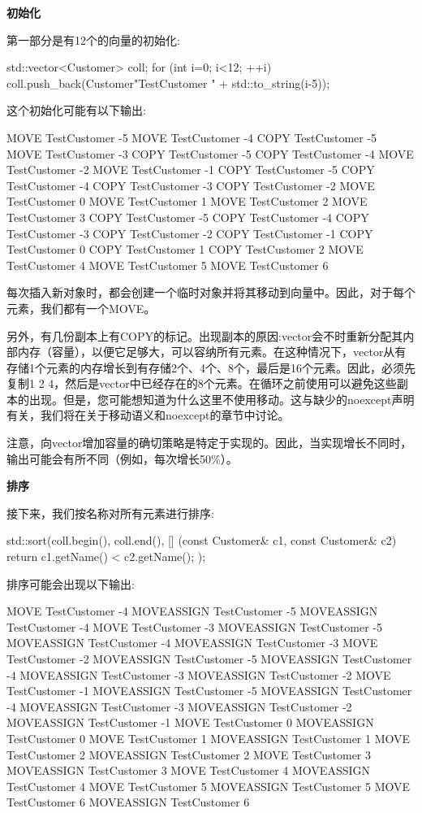 \textbf{初始化}

第一部分是有12个的向量的初始化:

\begin{cppcode}
std::vector<Customer> coll;
for (int i=0; i<12; ++i) {
	coll.push_back(Customer{"TestCustomer " + std::to_string(i-5)});
}
\end{cppcode}

这个初始化可能有以下输出:

\begin{outputcode}
MOVE TestCustomer -5
MOVE TestCustomer -4
COPY TestCustomer -5
MOVE TestCustomer -3
COPY TestCustomer -5
COPY TestCustomer -4
MOVE TestCustomer -2
MOVE TestCustomer -1
COPY TestCustomer -5
COPY TestCustomer -4
COPY TestCustomer -3
COPY TestCustomer -2
MOVE TestCustomer 0
MOVE TestCustomer 1
MOVE TestCustomer 2
MOVE TestCustomer 3
COPY TestCustomer -5
COPY TestCustomer -4
COPY TestCustomer -3
COPY TestCustomer -2
COPY TestCustomer -1
COPY TestCustomer 0
COPY TestCustomer 1
COPY TestCustomer 2
MOVE TestCustomer 4
MOVE TestCustomer 5
MOVE TestCustomer 6
\end{outputcode}

每次插入新对象时，都会创建一个临时对象并将其移动到向量中。因此，对于每个元素，我们都有一个MOVE。

另外，有几份副本上有COPY的标记。出现副本的原因:vector会不时重新分配其内部内存（容量），以便它足够大，可以容纳所有元素。在这种情况下，vector从有存储1个元素的内存增长到有存储2个、4个、8个，最后是16个元素。因此，必须先复制1 2 4，然后是vector中已经存在的8个元素。在循环之前使用可以避免这些副本的出现。但是，您可能想知道为什么这里不使用移动。这与缺少的noexcept声明有关，我们将在关于移动语义和noexcept的章节中讨论。

注意，向vector增加容量的确切策略是特定于实现的。因此，当实现增长不同时，输出可能会有所不同（例如，每次增长50\%）。

\textbf{排序}

接下来，我们按名称对所有元素进行排序:

\begin{cppcode}
std::sort(coll.begin(), coll.end(),
	[] (const Customer& c1, const Customer& c2) {
		return c1.getName() < c2.getName();
	});
\end{cppcode}

排序可能会出现以下输出:

\begin{outputcode}
MOVE TestCustomer -4
MOVEASSIGN TestCustomer -5
MOVEASSIGN TestCustomer -4
MOVE TestCustomer -3
MOVEASSIGN TestCustomer -5
MOVEASSIGN TestCustomer -4
MOVEASSIGN TestCustomer -3
MOVE TestCustomer -2
MOVEASSIGN TestCustomer -5
MOVEASSIGN TestCustomer -4
MOVEASSIGN TestCustomer -3
MOVEASSIGN TestCustomer -2
MOVE TestCustomer -1
MOVEASSIGN TestCustomer -5
MOVEASSIGN TestCustomer -4
MOVEASSIGN TestCustomer -3
MOVEASSIGN TestCustomer -2
MOVEASSIGN TestCustomer -1
MOVE TestCustomer 0
MOVEASSIGN TestCustomer 0
MOVE TestCustomer 1
MOVEASSIGN TestCustomer 1
MOVE TestCustomer 2
MOVEASSIGN TestCustomer 2
MOVE TestCustomer 3
MOVEASSIGN TestCustomer 3
MOVE TestCustomer 4
MOVEASSIGN TestCustomer 4
MOVE TestCustomer 5
MOVEASSIGN TestCustomer 5
MOVE TestCustomer 6
MOVEASSIGN TestCustomer 6
\end{outputcode}

